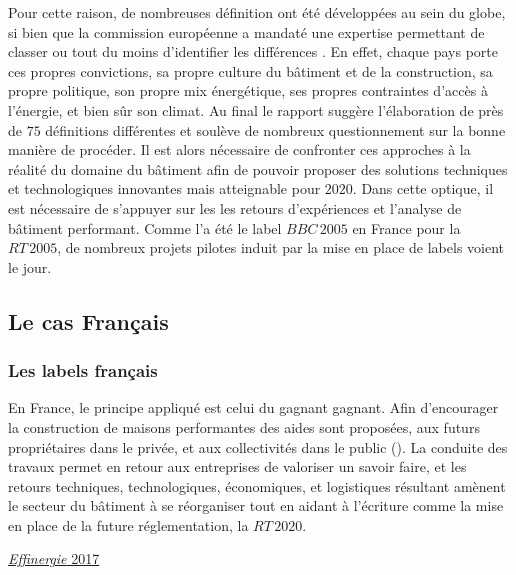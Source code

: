 Pour cette raison, de nombreuses définition ont été développées au sein du globe,
si bien que la commission européenne a mandaté une expertise permettant de classer ou
tout du moins d’identifier les différences \parencite{ECOFYS2013}.
En effet, chaque pays porte ces propres
convictions, sa propre culture du bâtiment et de la construction, sa propre politique,
son propre mix énergétique, ses propres contraintes d’accès à l’énergie, et bien sûr
son climat.
Au final le rapport suggère l’élaboration de près de $75$ définitions différentes
et soulève de nombreux questionnement sur la bonne manière de procéder.
Il est alors nécessaire de confronter ces approches à la réalité du domaine du bâtiment
afin de pouvoir proposer des solutions techniques et technologiques innovantes mais
atteignable pour $2020$. Dans cette optique, il est nécessaire de s’appuyer sur les
les retours d’expériences et l’analyse de bâtiment performant. Comme
l’a été le label $BBC\,2005$ en France pour la $RT\,2005$, de nombreux projets pilotes
induit par la mise en place de labels voient le jour.



\subsection{Le cas Français} %
\label{sub:le_cas_francais}
\subsubsection{Les labels français} %
\label{ssub:les_labels_francais}
En France, le principe appliqué est celui du gagnant gagnant. Afin d’encourager
la construction de maisons performantes des aides sont proposées, aux futurs propriétaires
dans le privée, et aux collectivités dans le public ().
La conduite des travaux permet en retour aux entreprises de valoriser un savoir faire, et
les retours techniques, technologiques, économiques, et logistiques résultant amènent
le secteur du bâtiment à se réorganiser tout en aidant à l’écriture comme la mise en place
de la future réglementation, la $RT\,2020$.

\href{http://www.certivea.fr/offres/label-effinergie-2017}{\textit{Effinergie} 2017}

